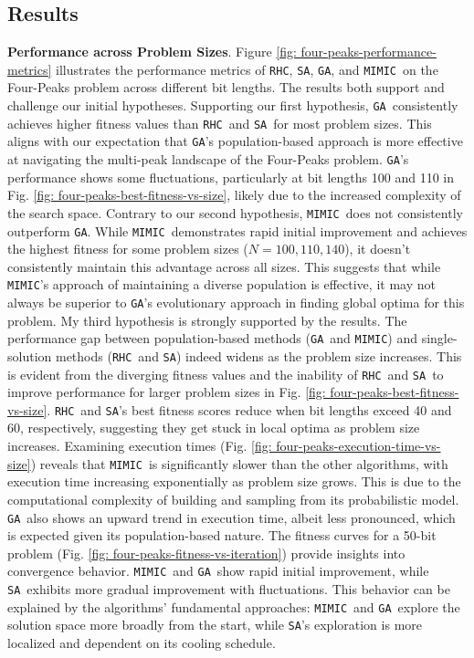 \documentclass[conference]{IEEEtran}
\newcommand{\sa}{\texttt{SA}}
\newcommand{\ga}{\texttt{GA}}
\newcommand{\rhc}{\texttt{RHC}}
\newcommand{\mimic}{\texttt{MIMIC}}
\begin{document}
\subsection{Results}
\textbf{Performance across Problem Sizes}. Figure \ref{fig: four-peaks-performance-metrics} illustrates the performance metrics of \rhc, \sa, \ga, and \mimic\ on the Four-Peaks problem across different bit lengths. The results both support and challenge our initial hypotheses.
Supporting our first hypothesis, \ga\ consistently achieves higher fitness values than \rhc\ and \sa\ for most problem sizes. This aligns with our expectation that \ga's population-based approach is more effective at navigating the multi-peak landscape of the Four-Peaks problem. \ga's performance shows some fluctuations, particularly at bit lengths 100 and 110 in Fig. \ref{fig: four-peaks-best-fitness-vs-size}, likely due to the increased complexity of the search space. Contrary to our second hypothesis, \mimic\ does not consistently outperform \ga. While \mimic\ demonstrates rapid initial improvement and achieves the highest fitness for some problem sizes ($N=100, 110, 140$), it doesn't consistently maintain this advantage across all sizes. This suggests that while \mimic's approach of maintaining a diverse population is effective, it may not always be superior to \ga's evolutionary approach in finding global optima for this problem. My third hypothesis is strongly supported by the results. The performance gap between population-based methods (\ga\ and \mimic) and single-solution methods (\rhc\ and \sa) indeed widens as the problem size increases. This is evident from the diverging fitness values and the inability of \rhc\ and \sa\ to improve performance for larger problem sizes in Fig. \ref{fig: four-peaks-best-fitness-vs-size}. \rhc\ and \sa's best fitness scores reduce when bit lengths exceed 40 and 60, respectively, suggesting they get stuck in local optima as problem size increases. 
Examining execution times (Fig.  \ref{fig: four-peaks-execution-time-vs-size}) reveals that \mimic\ is significantly slower than the other algorithms, with execution time increasing exponentially as problem size grows. This is due to the computational complexity of building and sampling from its probabilistic model. \ga\ also shows an upward trend in execution time, albeit less pronounced, which is expected given its population-based nature.
The fitness curves for a 50-bit problem (Fig. \ref{fig: four-peaks-fitness-vs-iteration}) provide insights into convergence behavior. \mimic\ and \ga\ show rapid initial improvement, while \sa\ exhibits more gradual improvement with fluctuations. This behavior can be explained by the algorithms' fundamental approaches: \mimic\ and \ga\ explore the solution space more broadly from the start, while \sa's exploration is more localized and dependent on its cooling schedule.
\end{document}
